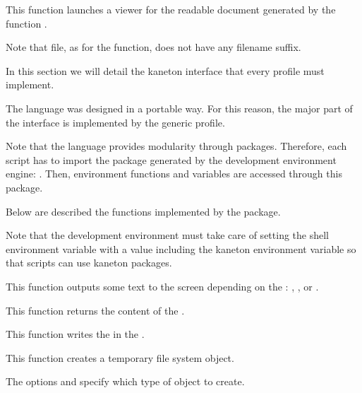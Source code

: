          {
	   This function launches a viewer for the readable document
	   generated by the function .

	   \-

	   Note that file, as for the  function,
	   does not have any filename suffix.
	 }



In this section we will detail the kaneton  interface that
every  profile must implement.

The  language was designed in a portable way. For this
reason, the major part of the  interface is implemented
by the  generic profile.

Note that the  language provides modularity through packages.
Therefore, each  script has to import the  package
generated by the development environment engine: .
Then, environment functions and variables are accessed through this package.

Below are described the functions implemented by the  package.

Note that the  development environment must take care of
setting the  shell environment variable with a value
including the  kaneton environment variable
so that scripts can use kaneton  packages.

         {
	   This function outputs some text to the screen depending on the
	   : , ,
	    or .
	 }

         {
	   This function returns the content of the .
	 }

         {
	   This function writes the  in the .
	 }

         {
	   This function creates a temporary file system object.

	   \-

	   The options  and 
	   specify which type of object to create.
	 }

